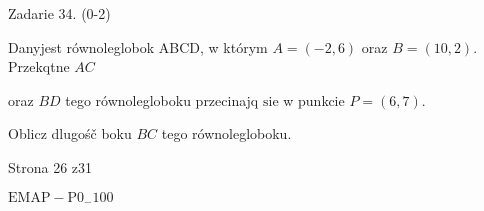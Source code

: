 \documentclass[a4paper,12pt]{article}
\begin{document}
Zadarie 34. (0-2)

Danyjest równoleglobok ABCD, w którym $A=(-2,6)$ oraz $B=(10,2)$. Przekqtne $AC$

oraz $BD$ tego równolegloboku przecinajq $\mathrm{s}\mathrm{i}\mathrm{e}$ w punkcie $P=(6,7).$

Oblicz dlugośč boku $BC$ tego równolegloboku.

Strona 26 z31

$\mathrm{E}\mathrm{M}\mathrm{A}\mathrm{P}-\mathrm{P}0_{-}100$
\end{document}
